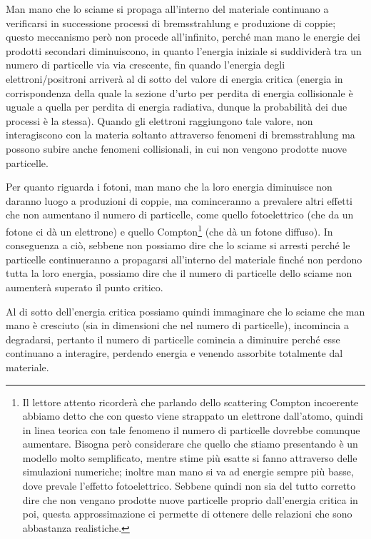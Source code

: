 Man mano che lo sciame si propaga all'interno del materiale continuano a verificarsi in successione processi di bremsstrahlung e produzione di coppie; questo meccanismo però non procede all'infinito, perché man mano le energie dei prodotti secondari diminuiscono, in quanto l'energia iniziale si suddividerà tra un numero di particelle via via crescente, fin quando l'energia degli elettroni/positroni arriverà al di sotto del valore di energia critica (energia in corrispondenza della quale la sezione d'urto per perdita di energia collisionale è uguale a quella per perdita di energia radiativa, dunque la probabilità dei due processi è la stessa). Quando gli elettroni raggiungono tale valore, non interagiscono con la materia soltanto attraverso fenomeni di bremsstrahlung ma possono subire anche fenomeni collisionali, in cui non vengono prodotte nuove particelle.

Per quanto riguarda i fotoni, man mano che la loro energia diminuisce non daranno luogo a produzioni di coppie, ma cominceranno a prevalere altri effetti che non aumentano il numero di particelle, come quello fotoelettrico (che da un fotone ci dà un elettrone) e quello Compton\footnote{Il lettore attento ricorderà che parlando dello scattering Compton incoerente abbiamo detto che con questo viene strappato un elettrone dall'atomo, quindi in linea teorica con tale fenomeno il numero di particelle dovrebbe comunque aumentare. Bisogna però considerare che quello che stiamo presentando è un modello molto semplificato, mentre stime più esatte si fanno attraverso delle simulazioni numeriche; inoltre man mano si va ad energie sempre più basse, dove prevale l'effetto fotoelettrico. Sebbene quindi non sia del tutto corretto dire che non vengano prodotte nuove particelle proprio dall'energia critica in poi, questa approssimazione ci permette di ottenere delle relazioni che sono abbastanza realistiche.} (che dà un fotone diffuso). In conseguenza a ciò, sebbene non possiamo dire che lo sciame si arresti perché le particelle continueranno a propagarsi all'interno del materiale finché non perdono tutta la loro energia, possiamo dire che il numero di particelle dello sciame non aumenterà superato il punto critico.

Al di sotto dell'energia critica possiamo quindi immaginare che lo sciame che man mano è cresciuto (sia in dimensioni che nel numero di particelle), incomincia a degradarsi, pertanto il numero di particelle comincia a diminuire perché esse continuano a interagire, perdendo energia e venendo assorbite totalmente dal materiale.

